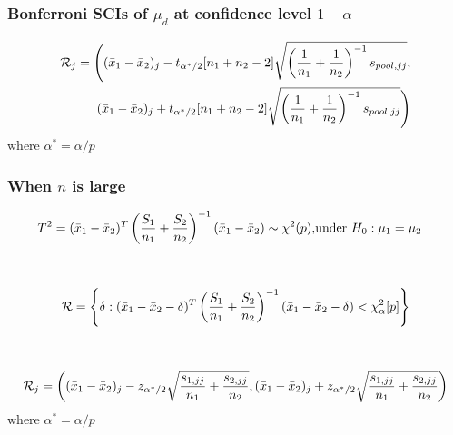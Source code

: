 \documentclass[12pt]{extarticle}
\newcommand{\<}{\langle}
\renewcommand{\>}{\rangle}
\theoremstyle{definition}
\begin{document}
\subsubsection{Bonferroni SCIs of $\mu_d$ at confidence level $1-\alpha$}
\begin{tcolorbox}[enhanced, drop fuzzy shadow, title=Bonferroni's SCI]
\begin{eqnarray*}
\mathcal{R}_j = \Bigg( (\Bar{x}_1 - \Bar{x}_2)_j - t_{\alpha^*/2}[n_1 + n_2 -2] \sqrt{\left( \frac{1}{n_1}+\frac{1}{n_2} \right)^{-1} s_{pool,jj}}, \\
(\Bar{x}_1 - \Bar{x}_2)_j + t_{\alpha^*/2}[n_1 + n_2 -2] \sqrt{\left( \frac{1}{n_1}+\frac{1}{n_2} \right)^{-1} s_{pool,jj}} \Bigg)
\end{eqnarray*}
where $\alpha^* = \alpha/p$
\end{tcolorbox}

\newpage
\subsubsection{When $n$ is large}
\begin{tcolorbox}[enhanced, drop fuzzy shadow, title=Hotelling's $T^2$; when $n$ is large]
\begin{eqnarray*}
T^2 = (\Bar{x}_1 -\Bar{x}_2)^T \left( \frac{S_1}{n_1}+\frac{S_2}{n_2}\right)^{-1}(\Bar{x}_1 -\Bar{x}_2) \sim \chi^2 (p), &\text{under } H_0:\mu_1=\mu_2 
\end{eqnarray*}
\end{tcolorbox}
\ \\
\begin{tcolorbox}[enhanced, drop fuzzy shadow, title=CR for unpaied two-sample; when $n$ is large]
\begin{eqnarray*}
\mathcal{R} = \left\{ \delta : (\Bar{x}_1 - \Bar{x}_2 -\delta)^T \left( \frac{S_1}{n_1}+\frac{S_2}{n_2} \right)^{-1} (\Bar{x}_1 - \Bar{x}_2 -\delta) < \chi^2_\alpha [p] \right\}
\end{eqnarray*}
\end{tcolorbox}
\ \\
\begin{tcolorbox}[enhanced, drop fuzzy shadow, title=Bonferroni's SCI; when $n$ is large]
\begin{eqnarray*}
\mathcal{R}_j = \left( (\Bar{x}_1 - \Bar{x}_2)_j -z_{\alpha^*/2} \sqrt{ \frac{s_{1,jj}}{n_1}+\frac{s_{2,jj}}{n_2}}, (\Bar{x}_1 - \Bar{x}_2)_j +z_{\alpha^*/2} \sqrt{ \frac{s_{1,jj}}{n_1}+\frac{s_{2,jj}}{n_2}} \right)
\end{eqnarray*}
where $\alpha^* = \alpha/p$
\end{tcolorbox}
\end{document}
